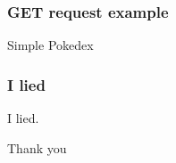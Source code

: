 \documentclass[aspectratio=1610]{beamer}
\begin{document}
\begin{frame}
\frametitle{GET request example}

\begin{center}
     \Huge Simple Pokedex
\end{center}

\end{frame}


\begin{frame}
\frametitle{I lied}

\begin{center}
     \Huge I lied.
\end{center}

\end{frame}


\begin{frame}

    \begin{center}
         \Huge Thank you
    \end{center}
\end{frame}



\end{document}
